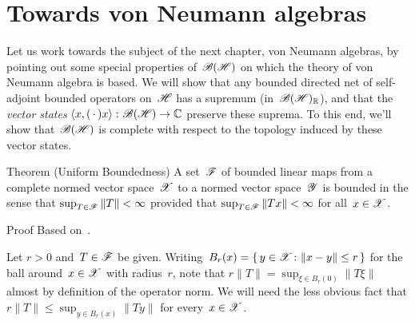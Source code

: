 \documentclass[a]{subfiles}
\begin{document}
\section{Towards von Neumann algebras}
\begin{parsec}%
\begin{point}%
Let us work towards
the subject of the next chapter, von Neumann algebras,
by pointing out some special properties
of~$\mathscr{B}(\mathscr{H})$
on which the theory of von Neumann algebra is based.
We will show that any bounded directed net
of self-adjoint bounded operators on~$\mathscr{H}$
has a supremum (in~$\mathscr{B}(\mathscr{H})_{\mathbb{R}}$),
and that the \emph{vector states}
$\left<x,(\,\cdot\,)x\right>\colon \mathscr{B}(\mathscr{H})\to\mathbb{C}$
preserve these suprema.
To this end, 
we'll show that~$\mathscr{B}(\mathscr{H})$ is complete
with respect to the topology induced by these vector states.
\end{point}
\begin{point}[pub]{Theorem (Uniform Boundedness)}%
A set~$\mathscr{F}$ of bounded linear maps 
from a complete normed vector space~$\mathscr{X}$
to a normed vector space~$\mathscr{Y}$
is bounded
in the sense that $\sup_{T\in \mathscr{F}} \|T\|<\infty$
provided that 
 $\sup_{T\in \mathscr{F}} \|Tx\|<\infty$
 for all~$x\in \mathscr{X}$.
\begin{point}{Proof}%
Based on~\cite{sokal}.
\begin{point}%
Let $r>0$ and~$T\in\mathscr{F}$ be given.
Writing~$B_r(x)=\{\,y\in\mathscr{X}\colon \|x-y\|\leq r\,\}$
for the ball around~$x\in\mathscr{X}$ with radius~$r$,
note that $r\|T\|=\sup_{\xi\in B_r(0)} \|T \xi\|$
almost by definition of the operator norm.
We will need the less obvious fact
that $r\|T\|\leq \sup_{y\in B_r(x)}\|T y\|$
for every~$x\in \mathscr{X}$.


\end{point}
\end{point}
\end{point}
\end{parsec}
\end{document}
